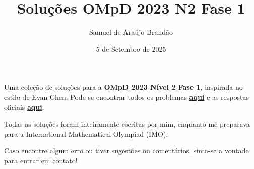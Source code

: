 \documentclass[12pt]{article}
\title{\sffamily\bfseries{Soluções OMpD 2023 N2 Fase 1}}
\author{Samuel de Araújo Brandão}
\date{5 de Setembro de 2025}
\begin{document}
  \maketitle
  Uma coleção de soluções para a \textbf{OMpD 2023 Nível 2 Fase 1}, inspirada no estilo de Evan Chen.
  Pode-se encontrar todos os problemas \textbf{\href{https://drive.google.com/file/d/1OrSQW4Ykh-TRShUsfWR7WDy5UTMngq2x/view}
  {aqui}} e as respostas oficiais \textbf{\href{https://drive.google.com/file/d/1ShpN6c-oEayureeyQcHpztjcPC7zP8k_/view}{aqui}}.

  Todas as soluções foram inteiramente escritas por mim, enquanto me preparava para a
  International Mathematical Olympiad (IMO).

  Caso encontre algum erro ou tiver sugestões ou comentários, sinta-se a vontade 
  para entrar em contato!

  \tableofcontents

  \clearpage
\end{document}
